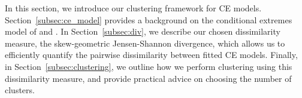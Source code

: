 \documentclass[
  12pt]{article}
\newcommand{\JSGa}{\mathop{\mathrm{JS}^{\mathrm{G}_{\lambda}}}\nolimits}
\begin{document}
In this section, we introduce our clustering framework for CE models. 
Section~\ref{subsec:ce_model} provides a background on the conditional extremes model of \citet{Heffernan2004} and \citet{Keef2013}. %
In Section~\ref{subsec:div}, we describe our chosen dissimilarity measure, the skew-geometric Jensen-Shannon divergence, which allows us to efficiently quantify the pairwise dissimilarity between fitted CE models.
Finally, in Section~\ref{subsec:clustering}, we outline how we perform clustering using this dissimilarity measure, and provide practical advice on choosing the number of clusters.
\end{document}
